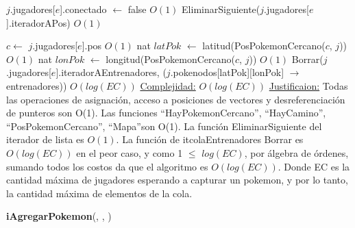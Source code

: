 \begin{Algoritmos}
\begin{algorithm}[H]
\begin{algorithmic}[1]
\State $j$.jugadores[$e$].conectado $\gets$ false \Comment $O(1)$
\State EliminarSiguiente($j$.jugadores[$e$].iteradorAPos) \Comment $O(1)$


\State $c \gets$ $j$.jugadores[$e$].pos 
 \Comment $O(1)$
    \State nat $latPok$ $\gets$ latitud(PosPokemonCercano($c$, $j$)) \Comment $O(1)$
    \State nat $lonPok$ $\gets$ longitud(PosPokemonCercano($c$, $j$)) \Comment $O(1)$
    \State Borrar($j$.jugadores[$e$].iteradorAEntrenadores, ($j$.pokenodos[latPok][lonPok] $\rightarrow$ entrenadores)) \Comment $O(log(EC))$
\EndIf
\medskip
\State \underline{Complejidad:} $O(log(EC))$ 
\State \underline{Justificaion:} Todas las operaciones de asignaci\'on, acceso a posiciones de vectores y desreferenciaci\'on de punteros son O(1). Las funciones ``HayPokemonCercano'', ``HayCamino'', ``PosPokemonCercano'', ``Mapa''\hspace{0.5mm}son O(1). La funci\'on EliminarSiguiente del iterador de lista es $O(1)$. La funci\'on de itcolaEntrenadores Borrar es $O(log(EC))$ en el peor caso, y como 1 $\leq$ $log(EC)$, por \'algebra de \'ordenes, sumando todos los costos da que el algoritmo es $O(log(EC))$. Donde EC es la cantidad m\'axima de jugadores esperando a capturar un pokemon, y por lo tanto, la cantidad m\'axima de elementos de la cola.


\end{algorithmic}
\end{algorithm}


\begin{algorithm}[H]
{\textbf{iAgregarPokemon}(, , )}
\begin{algorithmic}[1]


\end{algorithmic}
\end{algorithm}
\end{Algoritmos}
